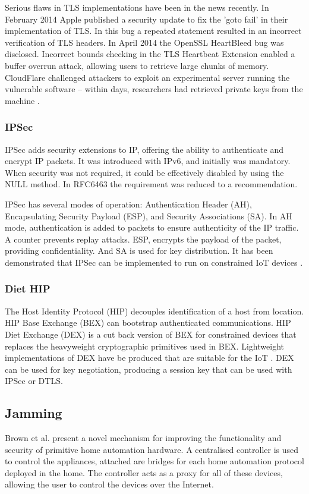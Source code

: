\documentclass[10pt,journal,compsoc]{IEEEtran}
\begin{document}
Serious flaws in TLS implementations have been in the news recently. In
February 2014 Apple published a security update to fix the 'goto fail' in their
implementation of TLS. In this bug a repeated statement resulted in an
incorrect verification of TLS headers. In April 2014 the OpenSSL HeartBleed bug
was disclosed. Incorrect bounds checking in the TLS Heartbeat Extension enabled
a buffer overrun attack, allowing users to retrieve large chunks of memory.
CloudFlare challenged attackers to exploit an experimental server running the
vulnerable software -- within days, researchers had retrieved private keys from
the machine \cite{CloudFlare2014}.

\subsubsection{IPSec}
IPSec adds security extensions to IP, offering the ability to authenticate and
encrypt IP packets. It was introduced with IPv6, and initially was mandatory.
When security was not required, it could be effectively disabled by using the
NULL method. In RFC6463 the requirement was reduced to a recommendation. 

IPSec has several modes of operation: Authentication Header (AH), Encapsulating
Security Payload (ESP), and Security Associations (SA). In AH mode,
authentication is added to packets to ensure authenticity of the IP traffic. A
counter prevents replay attacks. ESP, encrypts the payload of the packet,
providing confidentiality. And SA is used for key distribution. It has been
demonstrated that IPSec can be implemented to run on constrained IoT devices
\cite{Rubertis2013}.  

\subsubsection{Diet HIP}
The Host Identity Protocol (HIP) decouples identification of a host from
location. HIP Base Exchange (BEX) can bootstrap authenticated communications.
HIP Diet Exchange (DEX) is a cut back version of BEX for constrained devices
that replaces the heavyweight cryptographic primitives used in BEX. Lightweight
implementations of DEX have be produced that are suitable for the IoT
\cite{Meca2013}. DEX can be used for key negotiation, producing a session key
that can be used with IPSec or DTLS. 

\subsection{Jamming}
Brown et al. \cite{Brown2013} present a novel mechanism for improving the
functionality and security of primitive home automation hardware. A centralised
controller is used to control the appliances, attached are bridges for each
home automation protocol deployed in the home. The controller acts as a proxy
for all of these devices, allowing the user to control the devices over the
Internet. 
\end{document}
